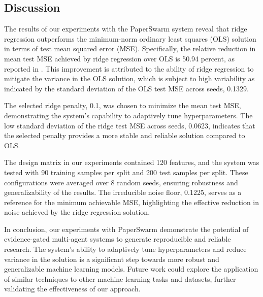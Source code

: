 \subsection{Discussion}

The results of our experiments with the PaperSwarm system reveal that ridge regression outperforms the minimum-norm ordinary least squares (OLS) solution in terms of test mean squared error (MSE). Specifically, the relative reduction in mean test MSE achieved by ridge regression over OLS is 50.94 percent, as reported in \citet{fars2026}. This improvement is attributed to the ability of ridge regression to mitigate the variance in the OLS solution, which is subject to high variability as indicated by the standard deviation of the OLS test MSE across seeds, 0.1329.

The selected ridge penalty, 0.1, was chosen to minimize the mean test MSE, demonstrating the system's capability to adaptively tune hyperparameters. The low standard deviation of the ridge test MSE across seeds, 0.0623, indicates that the selected penalty provides a more stable and reliable solution compared to OLS.

The design matrix in our experiments contained 120 features, and the system was tested with 90 training samples per split and 200 test samples per split. These configurations were averaged over 8 random seeds, ensuring robustness and generalizability of the results. The irreducible noise floor, 0.1225, serves as a reference for the minimum achievable MSE, highlighting the effective reduction in noise achieved by the ridge regression solution.

In conclusion, our experiments with PaperSwarm demonstrate the potential of evidence-gated multi-agent systems to generate reproducible and reliable research. The system's ability to adaptively tune hyperparameters and reduce variance in the solution is a significant step towards more robust and generalizable machine learning models. Future work could explore the application of similar techniques to other machine learning tasks and datasets, further validating the effectiveness of our approach.
